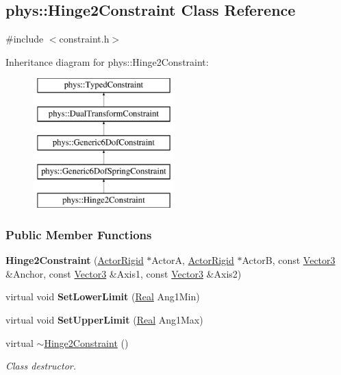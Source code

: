 \hypertarget{classphys_1_1Hinge2Constraint}{
\subsection{phys::Hinge2Constraint Class Reference}
\label{classphys_1_1Hinge2Constraint}
}


{\ttfamily \#include $<$constraint.h$>$}

Inheritance diagram for phys::Hinge2Constraint:\begin{figure}[H]
\begin{center}
\leavevmode
\includegraphics[height=5.000000cm]{classphys_1_1Hinge2Constraint}
\end{center}
\end{figure}
\subsubsection*{Public Member Functions}
\begin{DoxyCompactItemize}
\item 
\hypertarget{classphys_1_1Hinge2Constraint_a74b527ca2065a19be369ab0f609026b3}{
{\bfseries Hinge2Constraint} (\hyperlink{classphys_1_1ActorRigid}{ActorRigid} $\ast$ActorA, \hyperlink{classphys_1_1ActorRigid}{ActorRigid} $\ast$ActorB, const \hyperlink{classphys_1_1Vector3}{Vector3} \&Anchor, const \hyperlink{classphys_1_1Vector3}{Vector3} \&Axis1, const \hyperlink{classphys_1_1Vector3}{Vector3} \&Axis2)}
\label{classphys_1_1Hinge2Constraint_a74b527ca2065a19be369ab0f609026b3}

\item 
\hypertarget{classphys_1_1Hinge2Constraint_ade8e2c76f78d077db3ad4a12e9e75e10}{
virtual void {\bfseries SetLowerLimit} (\hyperlink{namespacephys_af7eb897198d265b8e868f45240230d5f}{Real} Ang1Min)}
\label{classphys_1_1Hinge2Constraint_ade8e2c76f78d077db3ad4a12e9e75e10}

\item 
\hypertarget{classphys_1_1Hinge2Constraint_a74737434af84dd488eef95bcbfa053e8}{
virtual void {\bfseries SetUpperLimit} (\hyperlink{namespacephys_af7eb897198d265b8e868f45240230d5f}{Real} Ang1Max)}
\label{classphys_1_1Hinge2Constraint_a74737434af84dd488eef95bcbfa053e8}

\item 
virtual \hyperlink{classphys_1_1Hinge2Constraint_a99ad380dd8ab1207a7af1a432f8406f3}{$\sim$Hinge2Constraint} ()
\begin{DoxyCompactList}\small\item\em Class destructor. \item\end{DoxyCompactList}\end{DoxyCompactItemize}
